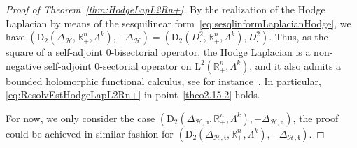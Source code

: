\documentclass[AHL,Unicode,longabstracts,published]{cedram}
\newcommand{\bbR}{\mathbb{R}}
\newcommand{\rmD}{\mathrm{D}}
\newcommand{\rmL}{\mathrm{L}}
\newcommand{\clH}{\mathcal{H}}
\newcommand{\fkn}{\mathfrak{n}}
\newcommand{\fkt}{\mathfrak{t}}
\begin{document}
\begin{proof}[{Proof of Theorem~\ref{thm:HodgeLapL2Rn+}}] 
By the realization of the Hodge Laplacian by means of the sesquilinear form~\eqref{eq:sesqlinformLaplacianHodge}, we have $(\rmD_2(\Delta_\clH,\bbR^n_+,\Lambda^k),-\Delta_\clH) = (\rmD_2(D_\cdot^2,\bbR^n_+,\Lambda^k),D_\cdot^2)$. Thus, as the square of a self-adjoint $0$-bisectorial operator, the Hodge Laplacian is a non-negative self-adjoint $0$-sectorial operator on $\rmL^2(\bbR^n_+,\Lambda^k)$, and it also admits a bounded holomorphic functional calculus, see for instance~\cite[Theorem~3.2.20]{EgertPhDThesis2015}. In particular, \eqref{eq:ResolvEstHodgeLapL2Rn+} in point~\eqref{theo2.15.2} holds.

For now, we only consider the case $(\rmD_2(\Delta_{\clH,\fkn},\bbR^n_+,\Lambda^k),-\Delta_{\clH,\fkn})$, the proof could be achieved in similar fashion for $(\rmD_2(\Delta_{\clH,\fkt},\bbR^n_+,\Lambda^k),-\Delta_{\clH,\fkt})$.


\end{proof}
\end{document}
